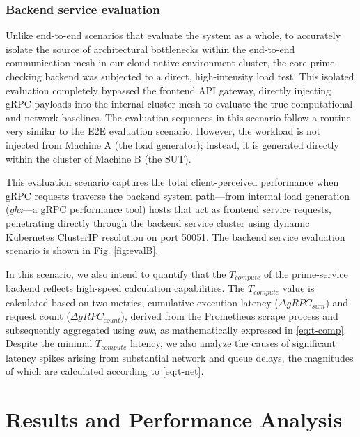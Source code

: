 \documentclass{ieeeaccess}
\begin{document}
\subsubsection{Backend service evaluation}
Unlike end-to-end scenarios that evaluate the system as a whole, to accurately isolate the source of architectural bottlenecks within the end-to-end communication mesh in our cloud native environment cluster, the core prime-checking backend was subjected to a direct, high-intensity load test. This isolated evaluation completely bypassed the frontend API gateway, directly injecting gRPC payloads into the internal cluster mesh to evaluate the true computational and network baselines. The evaluation sequences in this scenario follow a routine very similar to the E2E evaluation scenario. However, the workload is not injected from Machine A (the load generator); instead, it is generated directly within the cluster of Machine B (the SUT).

This evaluation scenario captures the total client-perceived performance when gRPC requests traverse the backend system path—from internal load generation (\textit{ghz}—a gRPC performance tool) hosts that act as frontend service requests, penetrating directly through the backend service cluster using dynamic Kubernetes ClusterIP resolution on port 50051. The backend service evaluation scenario is shown in Fig. \ref{fig:evalB}.

In this scenario, we also intend to quantify that the $T_{compute}$ of the prime-service backend reflects high-speed calculation capabilities. The $T_{compute}$ value is calculated based on two metrics, cumulative execution latency ($\Delta gRPC_{sum}$) and request count ($\Delta gRPC_{count}$), derived from the Prometheus scrape process and subsequently aggregated using \textit{awk}, as mathematically expressed in \eqref{eq:t-comp}. Despite the minimal $T_{compute}$ latency, we also analyze the causes of significant latency spikes arising from substantial network and queue delays, the magnitudes of which are calculated according to \eqref{eq:t-net}.



\section{Results and Performance Analysis}
\label{sec:results}
\end{document}
